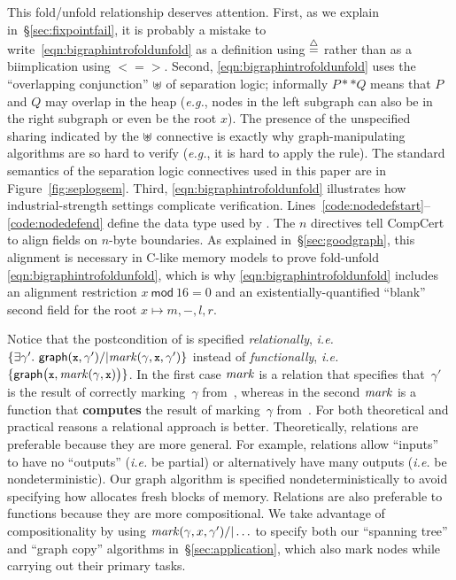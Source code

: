 {This fold/unfold relationship deserves attention.
First, as we explain in~\S\ref{sec:fixpointfail}, it is probably a mistake to write~\eqref{eqn:bigraphintrofoldunfold} as a definition using $\mathbin{\stackrel{\triangle}{=}}$ rather than as a biimplication using $<=>$.  Second, \eqref{eqn:bigraphintrofoldunfold} uses the ``overlapping conjunction'' $\ocon$ of separation logic; informally $P ** Q$ means that $P$ and $Q$ may overlap in the heap (\emph{e.g.}, nodes in the left subgraph can also be in the right subgraph or even be the root $x$).  The presence of the unspecified sharing indicated by the $\ocon$ connective is exactly why graph-manipulating algorithms are so hard to verify (\emph{e.g.}, it is hard to apply the  rule).  The standard semantics of the separation logic connectives used in this paper are in Figure~\ref{fig:seplogsem}.
Third, \eqref{eqn:bigraphintrofoldunfold} illustrates how industrial-strength settings complicate verification.  Lines~\mbox{\ref{code:nodedefstart}--\ref{code:nodedefend}} define the data type  used by .  The $n$\li{)} directives tell CompCert to align fields on $n$-byte boundaries.  As explained in~\S\ref{sec:goodgraph}, this alignment is necessary in C-like memory models to prove fold-unfold \eqref{eqn:bigraphintrofoldunfold}, which is why \eqref{eqn:bigraphintrofoldunfold} includes an alignment restriction $x~\mathsf{mod}~16 = 0$ and an existentially-quantified ``blank'' second field for the root $x \mapsto m,-,l,r$.

Notice that the postcondition of  is specified \emph{relationally}, \emph{i.e.} $\{\exists \gamma'.~ \p{graph}(\li{x},\gamma') /| \m{mark}(\gamma, \li{x}, \gamma')\}$ instead of \emph{functionally}, \emph{i.e.} $\{\mathsf{graph}\big({\texttt{\small x}},\mathit{mark}(\gamma, {\texttt{\small x}})\big)\}$. In the first case $\mathit{mark}$ is a relation that specifies that~$\gamma'$ is the result of correctly marking~$\gamma$ from~, whereas in the second $\mathit{mark}$ is a function that \textbf{computes} the result of marking~$\gamma$ from~. For both theoretical and practical reasons a relational approach is better.
Theoretically, relations are preferable because they are more general.  For example, relations allow ``inputs'' to have no ``outputs'' (\emph{i.e.} be partial) or alternatively have many outputs (\emph{i.e.} be nondeterministic).  Our graph  algorithm is specified nondeterministically to avoid specifying how  allocates fresh blocks of memory.  Relations are also preferable to functions because they are more compositional.
We take advantage of compositionality by using $\mathit{mark}(\gamma,x,\gamma') /| \ldots$ to specify both our ``spanning tree'' and ``graph copy'' algorithms in~\S\ref{sec:application}, which also mark nodes while carrying out their primary tasks.

}
